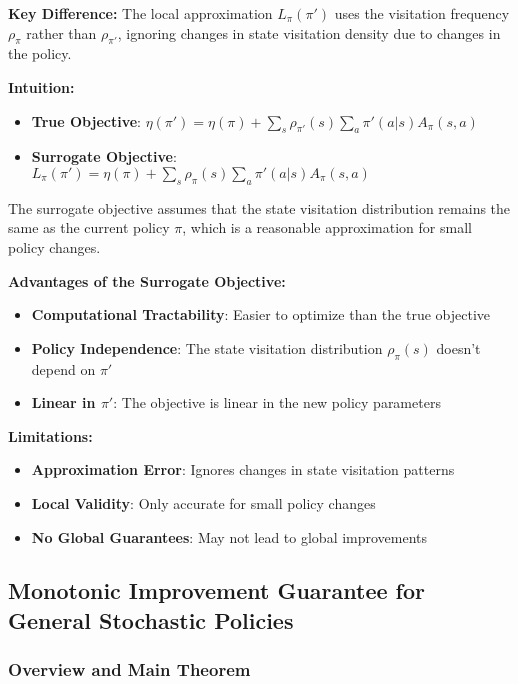 \textbf{Key Difference:}
The local approximation $L_{\pi}(\pi')$ uses the visitation frequency $\rho_{\pi}$ rather than $\rho_{\pi'}$, ignoring changes in state visitation density due to changes in the policy.

\textbf{Intuition:}
\begin{itemize}
    \item \textbf{True Objective}: $\eta(\pi') = \eta(\pi) + \sum_{s}\rho_{\pi'}(s)\sum_{a}\pi'(a|s)A_{\pi}(s, a)$
    \item \textbf{Surrogate Objective}: $L_{\pi}(\pi') = \eta(\pi) + \sum_{s}\rho_{\pi}(s)\sum_{a}\pi'(a|s)A_{\pi}(s, a)$
\end{itemize}

The surrogate objective assumes that the state visitation distribution remains the same as the current policy $\pi$, which is a reasonable approximation for small policy changes.

\textbf{Advantages of the Surrogate Objective:}
\begin{itemize}
    \item \textbf{Computational Tractability}: Easier to optimize than the true objective
    \item \textbf{Policy Independence}: The state visitation distribution $\rho_{\pi}(s)$ doesn't depend on $\pi'$
    \item \textbf{Linear in $\pi'$}: The objective is linear in the new policy parameters
\end{itemize}

\textbf{Limitations:}
\begin{itemize}
    \item \textbf{Approximation Error}: Ignores changes in state visitation patterns
    \item \textbf{Local Validity}: Only accurate for small policy changes
    \item \textbf{No Global Guarantees}: May not lead to global improvements
\end{itemize}

\subsection{Monotonic Improvement Guarantee for General Stochastic Policies}

\subsubsection{Overview and Main Theorem}

